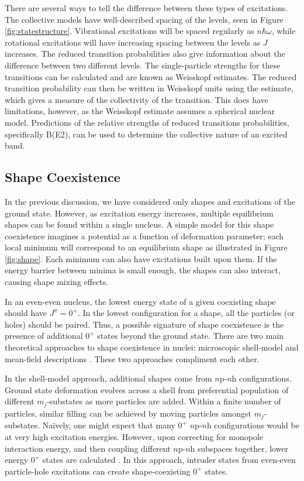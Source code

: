 There are several ways to tell the difference between these types of excitations. The collective models have well-described spacing of the levels, seen in Figure \ref{fig:statestructure}. Vibrational excitations will be spaced regularly as $n\hbar\omega$, while rotational excitations will have increasing spacing between the levels as $J$ increases. The reduced transition probabilities also give information about the difference between two different levels. The single-particle strengths for these transitions can be calculated and are known as Weisskopf estimates. The reduced transition probability can then be written in Weisskopf units using the estimate, which gives a measure of the collectivity of the transition. This does have limitations, however, as the Weisskopf estimate assumes a spherical nuclear model. Predictions of the relative strengths of reduced transitions probabilities, specifically B(E2), can be used to determine the collective nature of an excited band\citep{rowe10:_nuclearmodel}.

\subsection{Shape Coexistence}

In the previous discussion, we have considered only shapes and excitations of the ground state. However, as excitation energy increases, multiple equilibrium shapes can be found within a single nucleus. A simple model for this shape coexistence imagines a potential as a function of deformation parameter; each local minimum will correspond to an equilibrium shape as illustrated in Figure \ref{fig:shape}. Each minimum can also have excitations built upon them. If the energy barrier between minima is small enough, the shapes can also interact, causing shape mixing effects.



In an even-even nucleus, the lowest energy state of a given coexisting shape should have $J^{\pi}=0^+$. In the lowest configuration for a shape, all the particles (or holes) should be paired. Thus, a possible signature of shape coexistence is the presence of additional $0^+$ states beyond the ground state. There are two main theoretical approaches to shape coexistence in nuclei: microscopic shell-model and mean-field descriptions \citep{heyde11:_shape_coexist}. These two approaches compliment each other. 

In the shell-model approach, additional shapes come from $n$p-$n$h configurations. Ground state deformation evolves across a shell from preferential population of different $m_j$-substates as more particles are added. Within a finite number of particles, similar filling can be achieved by moving particles amongst $m_j$-substates. Na\"ively, one might expect that many $0^+$ $n$p-$n$h configurations would be at very high excitation energies. However, upon correcting for monopole interaction energy, and then coupling different $n$p-$n$h subspaces together, lower energy $0^+$ states are calculated \citep{caurier07:_shape_coexist}. In this approach, intruder states from even-even particle-hole excitations can create shape-coexisting $0^+$ states.

